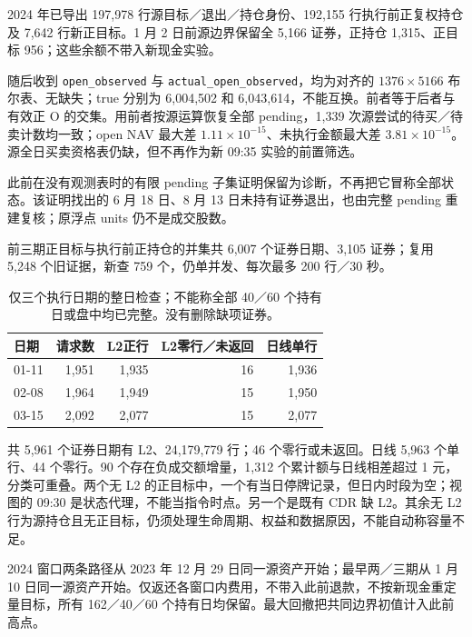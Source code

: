 2024 年已导出 197,978 行源目标／退出／持仓身份、192,155 行执行前正复权持仓及 7,642 行新正目标。1 月 2 日前源边界保留全 5,166 证券，正持仓 1,315、正目标 956；这些余额不带入新现金实验。

随后收到 \texttt{open\_observed} 与 \texttt{actual\_open\_observed}，均为对齐的 $1376\times5166$ 布尔表、无缺失；true 分别为 6,004,502 和 6,043,614，不能互换。前者等于后者与有效正 O 的交集。用前者按源运算恢复全部 pending，1,339 次源尝试的待买／待卖计数均一致；open NAV 最大差 $1.11\times10^{-15}$、未执行金额最大差 $3.81\times10^{-15}$。源全日买卖资格表仍缺，但不再作为新 09:35 实验的前置筛选。

此前在没有观测表时的有限 pending 子集证明保留为诊断，不再把它冒称全部状态。该证明找出的 6 月 18 日、8 月 13 日未持有证券退出，也由完整 pending 重建复核；原浮点 units 仍不是成交股数。

前三期正目标与执行前正持仓的并集共 6,007 个证券日期、3,105 证券；复用 5,248 个旧证据，新查 759 个，仍单并发、每次最多 200 行／30 秒。

\begin{table}[H]\centering\small
\begin{tabular}{lrrrr}
\toprule 日期 & 请求数 & L2正行 & L2零行／未返回 & 日线单行\\\midrule
01-11 & 1,951 & 1,935 & 16 & 1,936\\
02-08 & 1,964 & 1,949 & 15 & 1,950\\
03-15 & 2,092 & 2,077 & 15 & 2,077\\
\bottomrule
\end{tabular}
\caption{仅三个执行日期的整日检查；不能称全部 40／60 个持有日或盘中均已完整。没有删除缺项证券。}
\end{table}

共 5,961 个证券日期有 L2、24,179,779 行；46 个零行或未返回。日线 5,963 个单行、44 个零行。90 个存在负成交额增量，1,312 个累计额与日线相差超过 1 元，分类可重叠。两个无 L2 的正目标中，一个有当日停牌记录，但日内时段为空；视图的 09:30 是状态代理，不能当指令时点。另一个是既有 CDR 缺 L2。其余无 L2 行为源持仓且无正目标，仍须处理生命周期、权益和数据原因，不能自动称容量不足。

\clearpage
{}

2024 窗口两条路径从 2023 年 12 月 29 日同一源资产开始；最早两／三期从 1 月 10 日同一源资产开始。仅返还各窗口内费用，不带入此前退款，不按新现金重定量目标，所有 162／40／60 个持有日均保留。最大回撤把共同边界初值计入此前高点。

